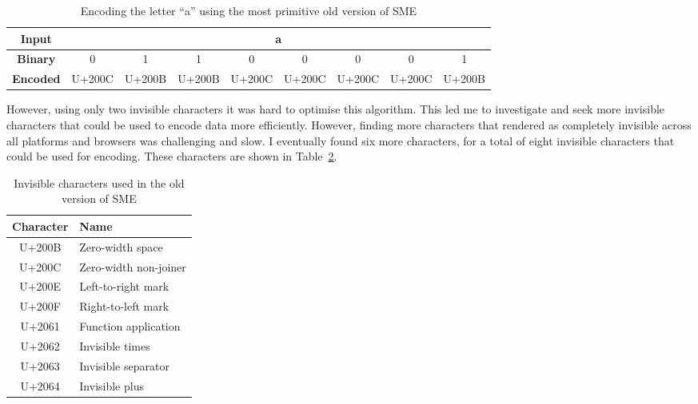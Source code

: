\documentclass{article}
\newcommand{\U}[1]{U+#1}
\begin{document}
\begin{table}[H]
  \centering
  \begin{tabular}{ccccccccc}
    \textbf{Input}   & \multicolumn{8}{c}{a}                                                                                                                         \\ \midrule
    \textbf{Binary}  & 0               & 1               & 1               & 0               & 0               & 0               & 0               & 1               \\ \midrule
    \textbf{Encoded} & {\tiny\U{200C}} & {\tiny\U{200B}} & {\tiny\U{200B}} & {\tiny\U{200C}} & {\tiny\U{200C}} & {\tiny\U{200C}} & {\tiny\U{200C}} & {\tiny\U{200B}} \\
  \end{tabular}
  \caption{Encoding the letter ``a'' using the most primitive old version of SME}\label{tab:encoding-a-old}
\end{table}

However, using only two invisible characters it was hard to optimise this algorithm. This led me to investigate and seek more invisible characters that could be used to encode data more efficiently. However, finding more characters that rendered as completely invisible across all platforms and browsers was challenging and slow. I eventually found six more characters, for a total of eight invisible characters that could be used for encoding. These characters are shown in Table~\ref{tab:invisible-characters-old}.

\begin{table}[H]
  \centering
  \begin{tabular}{cl}
    \toprule
    Character & Name                  \\ \midrule
    \U{200B}  & Zero-width space      \\
    \U{200C}  & Zero-width non-joiner \\
    \U{200E}  & Left-to-right mark    \\
    \U{200F}  & Right-to-left mark    \\
    \U{2061}  & Function application  \\
    \U{2062}  & Invisible times       \\
    \U{2063}  & Invisible separator   \\
    \U{2064}  & Invisible plus        \\ \bottomrule
  \end{tabular}
  \caption{Invisible characters used in the old version of SME}\label{tab:invisible-characters-old}
\end{table}
\end{document}
